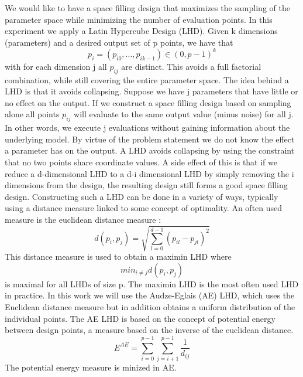 We would like to have a space filling design that maximizes the sampling of the parameter space while minimizing the number of evaluation points.
In this experiment we apply a Latin Hypercube Design (LHD). 
Given k dimensions (parameters) and a desired output set of p points, we have that 
\[
p_i = (p_{i0}, ..., p_{i k-1}) \in (0, p -1)^k
\]
with for each dimension j all $p_{ij}$ are distinct. This avoids a full factorial combination, while still covering the entire parameter space. 
The idea behind a LHD is that it avoids collapsing. Suppose we have j parameters that have little or no effect on the output. If we construct a space filling design based on sampling alone all points $p_{ij}$ will evaluate to the same output value (minus noise) for all j. In other words, we execute j evaluations without gaining information about the underlying model. By virtue of the problem statement we do not know the effect a parameter has on the output. A LHD avoids collapsing by using the constraint that no two points share coordinate values. A side effect of this is that if we reduce a d-dimensional LHD to a d-i dimensional LHD by simply removing the i dimensions from the design, the resulting design still forms a good space filling design.
Constructing such a LHD can be done in a variety of ways, typically using a distance measure linked to some concept of optimality. An often used measure is the euclidean distance measure :
\[
d(p_i, p_j) = \sqrt{\sum_{l=0}^{d-1}(p_{il}-p_{jl})^2}
\]
This distance measure is used to obtain a maximin LHD where
\[
min_{i \neq j} d(p_i,p_j)
\]
is maximal for all LHDs of size p. The maximin LHD is the most often used LHD in practice. In this work we will use the Audze-Eglais \citep{AudzeEglais, AudzeEglais2, AudzeEglais3} (AE) LHD, which uses the Euclidean distance measure but in addition obtains a uniform distribution of the individual points. 
The AE LHD is based on the concept of potential energy between design points, a measure based on the inverse of the euclidean distance.
\[
E^{AE} = \sum_{i=0}^{p-1} {\sum_{j=i+1}^{p-1} {\frac{1}{d_{ij}}}}
\]
The potential energy measure is minized in AE.
